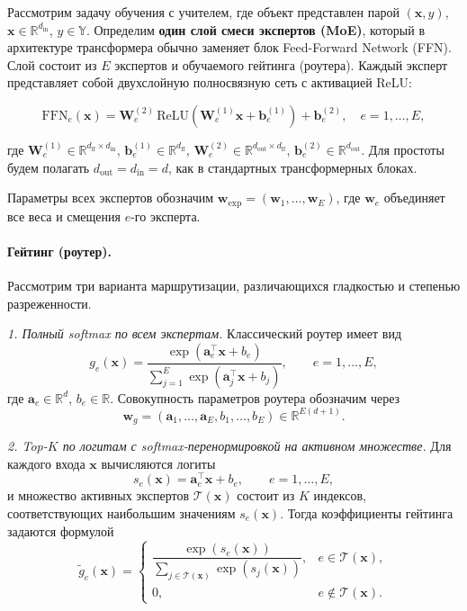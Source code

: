 \documentclass[11pt]{extarticle}
\theoremstyle{definition}
\theoremstyle{plain}
\theoremstyle{remark}
\begin{document}
Рассмотрим задачу обучения с учителем, где объект представлен парой \( (\mathbf{x}, y) \), \(\mathbf{x} \in \mathbb{R}^{d_{\text{in}}}\), \(y \in \mathbb{Y}\).  
Определим \textbf{один слой смеси экспертов (MoE)}, который в архитектуре трансформера обычно заменяет блок Feed-Forward Network (FFN). Слой состоит из \(E\) экспертов и обучаемого гейтинга (роутера). Каждый эксперт представляет собой двухслойную полносвязную сеть с активацией ReLU:

\[
\mathrm{FFN}_e(\mathbf{x}) = \mathbf{W}_e^{(2)} \,\mathrm{ReLU}\!\left(\mathbf{W}_e^{(1)}\mathbf{x} + \mathbf{b}_e^{(1)}\right) + \mathbf{b}_e^{(2)}, \quad e = 1,\dots,E,
\]

где  
\(\mathbf{W}_e^{(1)} \in \mathbb{R}^{d_{\text{ff}} \times d_{\text{in}}}\), \(\mathbf{b}_e^{(1)} \in \mathbb{R}^{d_{\text{ff}}}\),  
\(\mathbf{W}_e^{(2)} \in \mathbb{R}^{d_{\text{out}} \times d_{\text{ff}}}\), \(\mathbf{b}_e^{(2)} \in \mathbb{R}^{d_{\text{out}}}\).  
Для простоты будем полагать $d_{\text{out}}=d_{\text{in}}=d$, как в стандартных трансформерных блоках.

Параметры всех экспертов обозначим \(\mathbf{w}_{\text{exp}} = (\mathbf{w}_1,\dots,\mathbf{w}_E)\), где \(\mathbf{w}_e\) объединяет все веса и смещения \(e\)-го эксперта.

\paragraph{Гейтинг (роутер).}
Рассмотрим три варианта маршрутизации, различающихся гладкостью и степенью разреженности.

\textit{1. Полный softmax по всем экспертам.}
Классический роутер имеет вид
\begin{equation*}
    g_e(\mathbf x)
    =
    \frac{\exp(\mathbf a_e^\top \mathbf x+b_e)}
    {\sum\limits_{j=1}^{E}\exp(\mathbf a_j^\top \mathbf x+b_j)},
    \qquad e=1,\dots,E,
\end{equation*}
где $\mathbf a_e\in\mathbb R^d$, $b_e\in\mathbb R$. Совокупность параметров роутера обозначим через
\begin{equation*}
    \mathbf w_g=(\mathbf a_1,\dots,\mathbf a_E,b_1,\dots,b_E)\in\mathbb R^{E(d+1)}.
\end{equation*}

\textit{2. Top-$K$ по логитам с softmax-перенормировкой на активном множестве.}
Для каждого входа $\mathbf x$ вычисляются логиты
\begin{equation*}
    s_e(\mathbf x)=\mathbf a_e^\top \mathbf x+b_e,
    \qquad e=1,\dots,E,
\end{equation*}
и множество активных экспертов $\mathcal T(\mathbf x)$ состоит из $K$ индексов, соответствующих наибольшим значениям $s_e(\mathbf x)$. Тогда коэффициенты гейтинга задаются формулой
\begin{equation*}
    \tilde g_e(\mathbf x)=
    \begin{cases}
        \dfrac{\exp(s_e(\mathbf x))}
        {\sum\limits_{j\in\mathcal T(\mathbf x)}\exp(s_j(\mathbf x))},
        & e\in\mathcal T(\mathbf x),\\[1.2ex]
        0, & e\notin\mathcal T(\mathbf x).
    \end{cases}
\end{equation*}
\end{document}
